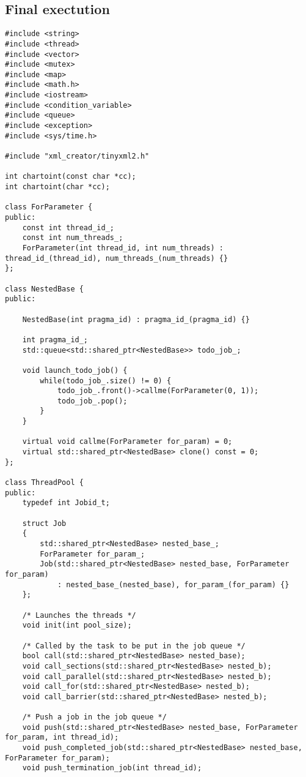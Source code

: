 \documentclass[a4paper,10pt,twoside]{book}
\begin{document}
\subsection{Final exectution}
\begin{lstlisting}[language=CCC, caption=thread\_pool.h]
#include <string>
#include <thread>
#include <vector>
#include <mutex>
#include <map>
#include <math.h>
#include <iostream>
#include <condition_variable>
#include <queue>
#include <exception>
#include <sys/time.h>

#include "xml_creator/tinyxml2.h"

int chartoint(const char *cc);
int chartoint(char *cc);

class ForParameter {
public:
    const int thread_id_;
    const int num_threads_;
    ForParameter(int thread_id, int num_threads) : thread_id_(thread_id), num_threads_(num_threads) {}
};

class NestedBase {
public:

    NestedBase(int pragma_id) : pragma_id_(pragma_id) {}
    
    int pragma_id_;
    std::queue<std::shared_ptr<NestedBase>> todo_job_;

    void launch_todo_job() {
        while(todo_job_.size() != 0) {
            todo_job_.front()->callme(ForParameter(0, 1));
            todo_job_.pop();
        }
    }
    
    virtual void callme(ForParameter for_param) = 0;
    virtual std::shared_ptr<NestedBase> clone() const = 0;
};

class ThreadPool {
public:
    typedef int Jobid_t;

    struct Job
    {
        std::shared_ptr<NestedBase> nested_base_;
        ForParameter for_param_;
        Job(std::shared_ptr<NestedBase> nested_base, ForParameter for_param)
            : nested_base_(nested_base), for_param_(for_param) {}
    };

    /* Launches the threads */
    void init(int pool_size);

    /* Called by the task to be put in the job queue */
    bool call(std::shared_ptr<NestedBase> nested_base);
    void call_sections(std::shared_ptr<NestedBase> nested_b);
    void call_parallel(std::shared_ptr<NestedBase> nested_b);
    void call_for(std::shared_ptr<NestedBase> nested_b);
    void call_barrier(std::shared_ptr<NestedBase> nested_b);

    /* Push a job in the job queue */
    void push(std::shared_ptr<NestedBase> nested_base, ForParameter for_param, int thread_id);
    void push_completed_job(std::shared_ptr<NestedBase> nested_base, ForParameter for_param);
    void push_termination_job(int thread_id);


\end{lstlisting}
\end{document}
